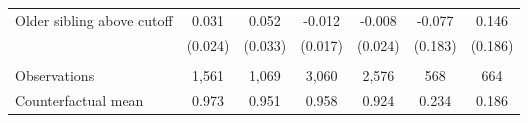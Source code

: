 {{\begin{tabular}{lcccccc}
Older sibling above cutoff&       0.031   &       0.052   &      -0.012   &      -0.008   &      -0.077   &       0.146   \\
                    &     (0.024)   &     (0.033)   &     (0.017)   &     (0.024)   &     (0.183)   &     (0.186)   \\
                    &               &               &               &               &               &               \\
Observations        &       1,561   &       1,069   &       3,060   &       2,576   &         568   &         664   \\
Counterfactual mean &       0.973   &       0.951   &       0.958   &       0.924   &       0.234   &       0.186   \\
 

\bottomrule
\end{tabular}
}
}

